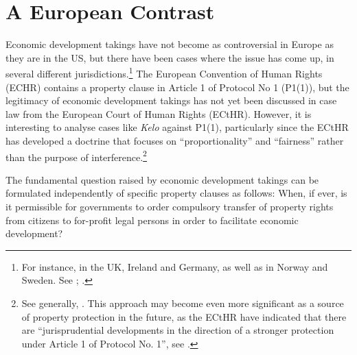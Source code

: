 
\section{A European Contrast}\label{sec:contrast}

Economic development takings have not become as controversial in Europe as they are in the US, but there have been cases where the issue has come up, in several different jurisdictions.\footnote{For instance, in the UK, Ireland and Germany, as well as in Norway and Sweden. See \cite[466-483]{walt11}; \cite{stenseth10}.} The European Convention of Human Rights (ECHR) contains a property clause in Article 1 of Protocol No 1 (P1(1)), but the legitimacy of economic development takings has not yet been discussed in case law from the European Court of Human Rights (ECtHR). However, it is interesting to analyse cases like {\it Kelo} against P1(1), particularly since the ECtHR has developed a doctrine that focuses on ``proportionality'' and ``fairness'' rather than the purpose of interference.\footnote{See generally, \cite[Chapter 5]{allen05}. This approach may become even more significant as a source of property protection in the future, as the ECtHR have indicated that there are ``jurisprudential developments in the direction of a stronger protection under Article 1 of Protocol No. 1'', see \cite[135]{lindheim12}.}

The fundamental question raised by economic development takings can be formulated independently of specific property clauses as follows: When, if ever, is it permissible for governments to order compulsory transfer of property rights from citizens to for-profit legal persons in order to facilitate economic development?

